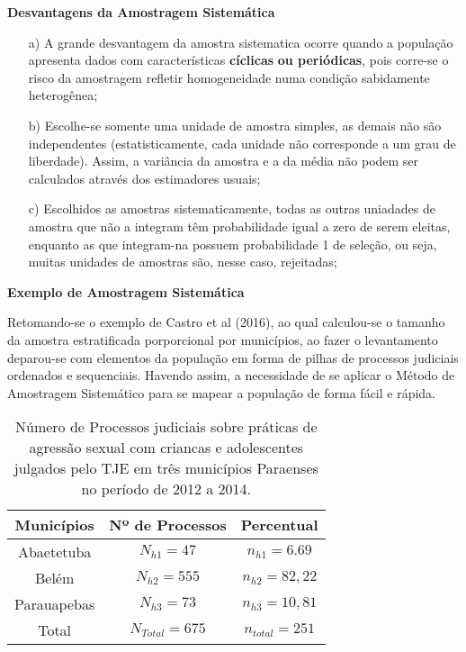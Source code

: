 

\textbf{Desvantagens da Amostragem Sistemática}
\vskip0.3cm


\begin{enumerate}
  \item[{a)}] A grande desvantagem da amostra sistematica ocorre
  quando a população apresenta dados com características \textbf{cíclicas}
  \textbf{ou periódicas}, pois corre-se o risco da amostragem refletir
  homogeneidade numa condição sabidamente heterogênea;
  \item[{b)}] Escolhe-se somente uma unidade de amostra simples, as demais não são independentes (estatisticamente, cada unidade não corresponde a um grau de liberdade). Assim, a variância da amostra e a da média não podem ser calculados através dos estimadores usuais;
  \item[{c)}] Escolhidos as amostras sistematicamente, todas as outras uniadades de amostra que não a integram têm probabilidade igual a zero de serem eleitas, enquanto as que integram-na possuem probabilidade 1 de seleção, ou seja, muitas unidades de amostras são, nesse caso, rejeitadas;
\end{enumerate}

\textbf{Exemplo de Amostragem Sistemática}
\vskip0.3cm

Retomando-se o exemplo de Castro et al (2016), ao qual calculou-se o tamanho da
amostra estratificada porporcional por municípios, ao fazer o levantamento deparou-se com elementos da população em forma de pilhas de processos judiciais ordenados
e sequenciais. Havendo assim, a necessidade de se aplicar o Método de Amostragem
Sistemático para se mapear a população de forma fácil e rápida.


\begin{table}[!htb]
    \centering
    {
    \caption{Número de Processos judiciais sobre práticas de agressão sexual com criancas e
adolescentes julgados pelo TJE em três municípios Paraenses no período de 2012 a 2014.}
    \label{amostras estratificada}
    \vspace{0.1cm}
\begin{tabular}{c|c|c}
  \hline\hline
  Municípios   & Nº de Processos &  Percentual \\
  \hline\hline
   Abaetetuba  & $N_{h1}=47$     & $n_{h1}= 6.69$        \\
   Belém       & $N_{h2}=555$    & $n_{h2}= 82,22$       \\
   Parauapebas & $N_{h3}=73$     & $n_{h3}= 10,81$       \\
   \hline\hline 
   Total       & $N_{Total}=675$ & $n_{total}=251$ \\ 
  \hline\hline
\end{tabular}}
\\
\hspace{-1.0cm}
\end{table}


